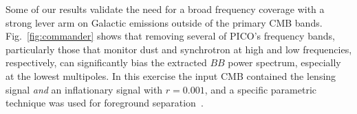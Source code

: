\documentclass[PICOReport.tex]{subfiles}
\begin{document}



Some of our results validate the need for a broad frequency coverage with a strong lever arm on Galactic emissions outside of the primary CMB bands. Fig.~\ref{fig:commander} shows that removing several of PICO's frequency bands, particularly those that monitor dust and synchrotron at high and low frequencies, respectively, can significantly bias the extracted $BB$ power spectrum, especially at the lowest multipoles. In this exercise the input CMB contained the lensing signal {\it and} an inflationary signal with $r=0.001$, and a specific parametric technique was used for foreground separation~\citep{eriksen/etal:2008}. 
\end{document}
